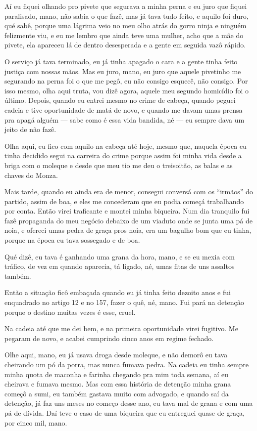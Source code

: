 Aí eu fiquei olhando pro pivete que segurava a minha perna e eu juro que
fiquei paralisado, mano, não sabia o que fazê, mas já tava tudo feito, e
aquilo foi duro, qué sabê, porque uma lágrima veio no meu olho atrás do
gorro ninja e ninguém felizmente viu, e eu me lembro que ainda teve uma
mulher, acho que a mãe do pivete, ela apareceu lá de dentro desesperada
e a gente em seguida vazô rápido.

O serviço já tava terminado, eu já tinha apagado o cara e a gente tinha
feito justiça com nossas mãos. Mas eu juro, mano, eu juro que aquele
pivetinho me segurando na perna foi o que me pegô, eu não consigo
esquecê, não consigo. Por isso mesmo, olha aqui truta, vou dizê agora,
aquele meu segundo homicídio foi o último. Depois, quando eu entrei
mesmo no crime de cabeça, quando peguei cadeia e tive oportunidade de
matá de novo, e quando me davam umas prensa pra apagá alguém --- sabe
como é essa vida bandida, né --- eu sempre dava um jeito de não fazê.

Olha aqui, eu fico com aquilo na cabeça até hoje, mesmo que, naquela
época eu tinha decidido segui na carreira do crime porque assim foi
minha vida desde a briga com o moleque e desde que meu tio me deu o
treisoitão, as balas e as chaves do Monza.

Mais tarde, quando eu ainda era de menor, consegui conversá com os
``irmãos'' do partido, assim de boa, e eles me concederam que eu podia
começá trabalhando por conta. Então virei traficante e montei minha
biqueira. Num dia tranquilo fui fazê propaganda do meu negócio debaixo
de um viaduto onde se junta uma pá de noia, e ofereci umas pedra de
graça pros noia, era um bagulho bom que eu tinha, porque na época eu
tava sossegado e de boa.

Qué dizê, eu tava é ganhando uma grana da hora, mano, e se eu mexia com
tráfico, de vez em quando aparecia, tá ligado, né, umas fitas de uns
assaltos também.

Então a situação ficô embaçada quando eu já tinha feito dezoito anos e
fui enquadrado no artigo 12 e no 157, fazer o quê, né, mano. Fui pará na
detenção porque o destino muitas vezes é esse, cruel.

Na cadeia até que me dei bem, e na primeira oportunidade virei fugitivo.
Me pegaram de novo, e acabei cumprindo cinco anos em regime fechado.

Olhe aqui, mano, eu já usava droga desde moleque, e não demorô eu tava
cheirando um pó da porra, mas nunca fumava pedra. Na cadeia eu tinha
sempre minha quota de maconha e farinha chegando pra mim toda semana, aí
eu cheirava e fumava mesmo. Mas com essa história de detenção minha
grana começô a sumi, eu também gastava muito com advogado, e quando saí
da detenção, já faz uns meses no começo desse ano, eu tava mal de grana
e com uma pá de dívida. Daí teve o caso de uma biqueira que eu entreguei
quase de graça, por cinco mil, mano.

